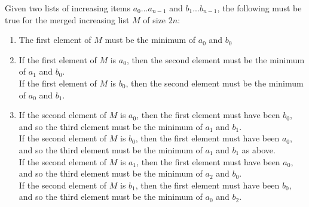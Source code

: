 \documentclass[letterpaper,notitlepage,twoside]{article}
\begin{document}
Given two lists of increasing items $a_0...a_{n - 1}$ and $b_1...b_{n - 1}$, the following must be true for the merged increasing list $M$ of size $2n$:
\begin{enumerate}
\item The first element of $M$ must be the minimum of $a_0$ and $b_0$
\item If the first element of $M$ is $a_0$, then the second element must be the minimum of $a_1$ and $b_0$. \\
      If the first element of $M$ is $b_0$, then the second element must be the minimum of $a_0$ and $b_1$.
\item If the second element of $M$ is $a_0$, then the first element must have been $b_0$, and so the third element must be the minimum of $a_1$ and $b_1$. \\
      If the second element of $M$ is $b_0$, then the first element must have been $a_0$, and so the third element must be the minimum of $a_1$ and $b_1$ as above. \\
	  If the second element of $M$ is $a_1$, then the first element must have been $a_0$, and so the third element must be the minimum of $a_2$ and $b_0$. \\
	  If the second element of $M$ is $b_1$, then the first element must have been $b_0$, and so the third element must be the minimum of $a_0$ and $b_2$.
\end{enumerate}
\end{document}
